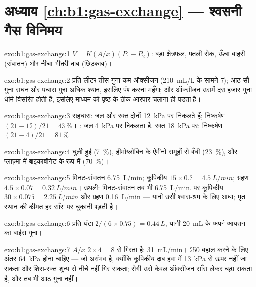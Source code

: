 \section*{अध्याय \ref{ch:b1:gas-exchange} --- श्वसनी गैस विनिमय}

\begin{solution}{exo:b1:gas-exchange:1}
$\dot V = K(A/x)(P_1 - P_2)$: बड़ा क्षेत्रफल, पतली रोक,
ऊँचा बाहरी  (संवातन) और नीचा भीतरी दाब
(छिड़काव)।
\end{solution}

\begin{solution}{exo:b1:gas-exchange:2}
प्रति लीटर तीस गुना कम ऑक्सीजन (\qty{210}{mL/L} के सामने \qty{7}{});
आठ सौ गुना सघन और पचास गुना अधिक श्यान, इसलिए पंप करना महँगा;
और ऑक्सीजन उसमें दस हज़ार गुना धीमे विसरित होती है, इसलिए
माध्यम को पृष्ठ के ठीक आरपार चलाना ही पड़ता है।
\end{solution}

\begin{solution}{exo:b1:gas-exchange:3}
सहधारा: जल और रक्त दोनों \qty{12}{kPa} पर निकलते हैं; निष्कर्षण
$(21 - 12)/21 = \qty{43}{\%}$। : जल \qty{4}{kPa} पर निकलता है,
रक्त \qty{18}{kPa} पर; निष्कर्षण $(21 - 4)/21 =
\qty{81}{\%}$।
\end{solution}

\begin{solution}{exo:b1:gas-exchange:4}
घुली हुई (\qty{7}{\%}), हीमोग्लोबिन के ऐमीनो समूहों से बँधी
(\qty{23}{\%}), और प्लाज़्मा में बाइकार्बोनेट के रूप में (\qty{70}{\%})।
\end{solution}

\begin{solution}{exo:b1:gas-exchange:5}
मिनट-संवातन \qty{6.75}{L/min}; कूपिकीय $15\times 0.3 = \qty{4.5}{L/min}$;
ग्रहण $4.5\times 0.07 = \qty{0.32}{L/min}$। उथली: मिनट-संवातन तब भी
\qty{6.75}{L/min}, पर कूपिकीय $30\times 0.075 =
\qty{2.25}{L/min}$ और ग्रहण \qty{0.16}{L/min} --- यानी उसी
श्वास-श्रम के लिए आधा; मृत स्थान की कीमत हर साँस पर चुकानी पड़ती है।
\end{solution}

\begin{solution}{exo:b1:gas-exchange:6}
प्रति घंटा $2/(6\times 0.75) = \qty{0.44}{L}$, यानी \qty{20}{mL} के
अपने आयतन का बाईस गुना।
\end{solution}

\begin{solution}{exo:b1:gas-exchange:7}
$A/x$ $2\times 4 = 8$ से गिरता है: \qty{31}{mL/min}। \qty{250}{} बहाल
करने के लिए अंतर \qty{64}{kPa} होना चाहिए --- जो असंभव है, क्योंकि
कूपिकीय दाब हवा में \qty{13}{kPa} से ऊपर नहीं जा सकता और शिरा-रक्त
शून्य से नीचे नहीं गिर सकता; रोगी उसे केवल ऑक्सीजन साँस लेकर चढ़ा सकता
है, और तब भी आठ गुना नहीं।
\end{solution}


